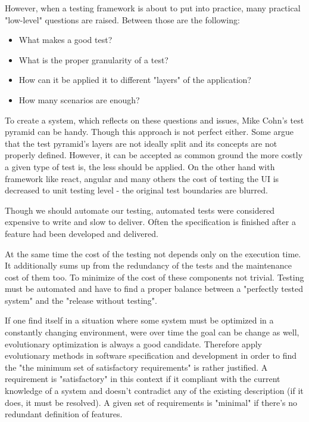 \documentclass[conference]{IEEEtran}
\begin{document}

However, when a testing framework is about to put into practice, many practical "low-level" questions are raised. Between those are the following:
\begin{itemize}
    \item What makes a good test?
    \item What is the proper granularity of a test?
    \item How can it be applied it to different "layers" of the application?
    \item How many scenarios are enough?
\end{itemize}

To create a system, which reflects on these questions and issues, Mike Cohn's test pyramid can be handy. Though this approach is not perfect either. Some argue that the test pyramid's layers are not ideally split and its concepts are not properly defined. \cite{tpy.ek.leantesting, tpy.jc.tpyml} However, it can be accepted as common ground the more costly a given type of test is, the less should be applied. On the other hand with framework like react, angular and many others the cost of testing the UI is decreased to unit testing level - the original test boundaries are blurred.


Though we should automate our testing, automated tests were considered expensive to write and slow to deliver. Often the specification is finished after a feature had been developed and delivered.

At the same time the cost of the testing not depends only on the execution time. It additionally sums up from the redundancy of the tests and the maintenance cost of them too. To minimize of the cost of these components not trivial. Testing must be automated and have to find a proper balance between a "perfectly tested system" and the "release without testing".

If one find itself in a situation where some system must be optimized in a constantly changing environment, were over time the goal can be change as well, evolutionary optimization is always a good candidate. Therefore apply evolutionary methods in software specification and development in order to find the "the minimum set of satisfactory requirements" is rather justified. A requirement is "satisfactory" in this context if it compliant with the current knowledge of a system and doesn't contradict any of the existing description (if it does, it must be resolved). A given set of requirements is "minimal" if there's no redundant definition of features.
\end{document}
